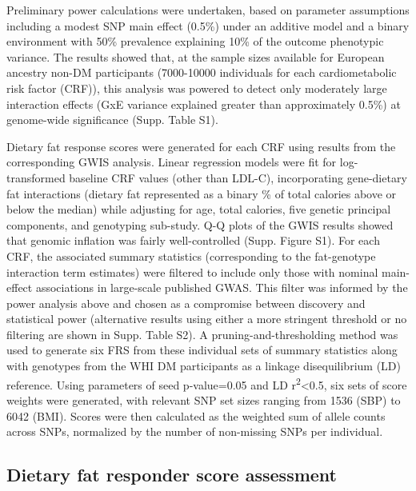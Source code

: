 \documentclass[]{article}
\begin{document}
Preliminary power calculations were undertaken, based on parameter
assumptions including a modest SNP main effect (0.5\%) under an additive
model and a binary environment with 50\% prevalence explaining 10\% of
the outcome phenotypic variance. The results showed that, at the sample
sizes available for European ancestry non-DM participants (7000-10000
individuals for each cardiometabolic risk factor (CRF)), this analysis
was powered to detect only moderately large interaction effects (GxE
variance explained greater than approximately 0.5\%) at genome-wide
significance (Supp. Table S1).

Dietary fat response scores were generated for each CRF using results
from the corresponding GWIS analysis. Linear regression models were fit
for log-transformed baseline CRF values (other than LDL-C),
incorporating gene-dietary fat interactions (dietary fat represented as
a binary \% of total calories above or below the median) while adjusting
for age, total calories, five genetic principal components, and
genotyping sub-study. Q-Q plots of the GWIS results showed that genomic
inflation was fairly well-controlled (Supp. Figure S1). For each CRF,
the associated summary statistics (corresponding to the fat-genotype
interaction term estimates) were filtered to include only those with
nominal main-effect associations in large-scale published GWAS. This
filter was informed by the power analysis above and chosen as a
compromise between discovery and statistical power (alternative results
using either a more stringent threshold or no filtering are shown in
Supp. Table S2). A pruning-and-thresholding method was used to generate
six FRS from these individual sets of summary statistics along with
genotypes from the WHI DM participants as a linkage disequilibrium (LD)
reference. Using parameters of seed p-value=0.05 and LD
r\textsuperscript{2}\textless{}0.5, six sets of score weights were
generated, with relevant SNP set sizes ranging from 1536 (SBP) to 6042
(BMI). Scores were then calculated as the weighted sum of allele counts
across SNPs, normalized by the number of non-missing SNPs per
individual.

\hypertarget{dietary-fat-responder-score-assessment}{%
\subsection{Dietary fat responder score
assessment}\label{dietary-fat-responder-score-assessment}}
\end{document}
